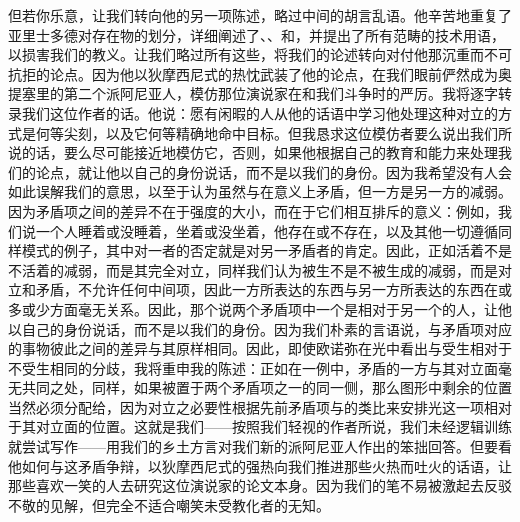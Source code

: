 但若你乐意，让我们转向他的另一项陈述，略过中间的胡言乱语。他辛苦地重复了亚里士多德对存在物的划分，详细阐述了、、和，并提出了所有范畴的技术用语，以损害我们的教义。让我们略过所有这些，将我们的论述转向对付他那沉重而不可抗拒的论点。因为他以狄摩西尼式的热忱武装了他的论点，在我们眼前俨然成为奥提塞里的第二个派阿尼亚人，模仿那位演说家在和我们斗争时的严厉。我将逐字转录我们这位作者的话。他说：愿有闲暇的人从他的话语中学习他处理这种对立的方式是何等尖刻，以及它何等精确地命中目标。但我恳求这位模仿者要么说出我们所说的话，要么尽可能接近地模仿它，否则，如果他根据自己的教育和能力来处理我们的论点，就让他以自己的身份说话，而不是以我们的身份。因为我希望没有人会如此误解我们的意思，以至于认为虽然与在意义上矛盾，但一方是另一方的减弱。因为矛盾项之间的差异不在于强度的大小，而在于它们相互排斥的意义：例如，我们说一个人睡着或没睡着，坐着或没坐着，他存在或不存在，以及其他一切遵循同样模式的例子，其中对一者的否定就是对另一矛盾者的肯定。因此，正如活着不是不活着的减弱，而是其完全对立，同样我们认为被生不是不被生成的减弱，而是对立和矛盾，不允许任何中间项，因此一方所表达的东西与另一方所表达的东西在或多或少方面毫无关系。因此，那个说两个矛盾项中一个是相对于另一个的人，让他以自己的身份说话，而不是以我们的身份。因为我们朴素的言语说，与矛盾项对应的事物彼此之间的差异与其原样相同。因此，即使欧诺弥在光中看出与受生相对于不受生相同的分歧，我将重申我的陈述：正如在一例中，矛盾的一方与其对立面毫无共同之处，同样，如果被置于两个矛盾项之一的同一侧，那么图形中剩余的位置当然必须分配给，因为对立之必要性根据先前矛盾项与的类比来安排光这一项相对于其对立面的位置。这就是我们——按照我们轻视的作者所说，我们未经逻辑训练就尝试写作——用我们的乡土方言对我们新的派阿尼亚人作出的笨拙回答。但要看他如何与这矛盾争辩，以狄摩西尼式的强热向我们推进那些火热而吐火的话语，让那些喜欢一笑的人去研究这位演说家的论文本身。因为我们的笔不易被激起去反驳不敬的见解，但完全不适合嘲笑未受教化者的无知。\par

